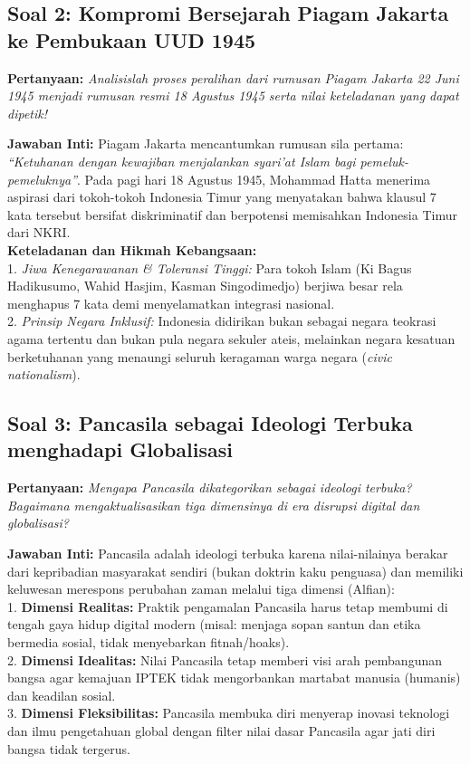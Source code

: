 \documentclass[10pt,a4paper]{article}
\begin{document}
\subsection{Soal 2: Kompromi Bersejarah Piagam Jakarta ke Pembukaan UUD 1945}
\textbf{Pertanyaan:} \textit{Analisislah proses peralihan dari rumusan Piagam Jakarta 22 Juni 1945 menjadi rumusan resmi 18 Agustus 1945 serta nilai keteladanan yang dapat dipetik!}
\begin{conceptbox}
\textbf{Jawaban Inti:} Piagam Jakarta mencantumkan rumusan sila pertama: \textit{``Ketuhanan dengan kewajiban menjalankan syari'at Islam bagi pemeluk-pemeluknya''}. Pada pagi hari 18 Agustus 1945, Mohammad Hatta menerima aspirasi dari tokoh-tokoh Indonesia Timur yang menyatakan bahwa klausul 7 kata tersebut bersifat diskriminatif dan berpotensi memisahkan Indonesia Timur dari NKRI.\\
\textbf{Keteladanan dan Hikmah Kebangsaan:}\\
1. \textit{Jiwa Kenegarawanan \& Toleransi Tinggi:} Para tokoh Islam (Ki Bagus Hadikusumo, Wahid Hasjim, Kasman Singodimedjo) berjiwa besar rela menghapus 7 kata demi menyelamatkan integrasi nasional.\\
2. \textit{Prinsip Negara Inklusif:} Indonesia didirikan bukan sebagai negara teokrasi agama tertentu dan bukan pula negara sekuler ateis, melainkan negara kesatuan berketuhanan yang menaungi seluruh keragaman warga negara (\textit{civic nationalism}).
\end{conceptbox}

\subsection{Soal 3: Pancasila sebagai Ideologi Terbuka menghadapi Globalisasi}
\textbf{Pertanyaan:} \textit{Mengapa Pancasila dikategorikan sebagai ideologi terbuka? Bagaimana mengaktualisasikan tiga dimensinya di era disrupsi digital dan globalisasi?}
\begin{conceptbox}
\textbf{Jawaban Inti:} Pancasila adalah ideologi terbuka karena nilai-nilainya berakar dari kepribadian masyarakat sendiri (bukan doktrin kaku penguasa) dan memiliki keluwesan merespons perubahan zaman melalui tiga dimensi (Alfian):\\
1. \textbf{Dimensi Realitas:} Praktik pengamalan Pancasila harus tetap membumi di tengah gaya hidup digital modern (misal: menjaga sopan santun dan etika bermedia sosial, tidak menyebarkan fitnah/hoaks).\\
2. \textbf{Dimensi Idealitas:} Nilai Pancasila tetap memberi visi arah pembangunan bangsa agar kemajuan IPTEK tidak mengorbankan martabat manusia (humanis) dan keadilan sosial.\\
3. \textbf{Dimensi Fleksibilitas:} Pancasila membuka diri menyerap inovasi teknologi dan ilmu pengetahuan global dengan filter nilai dasar Pancasila agar jati diri bangsa tidak tergerus.
\end{conceptbox}
\end{document}
